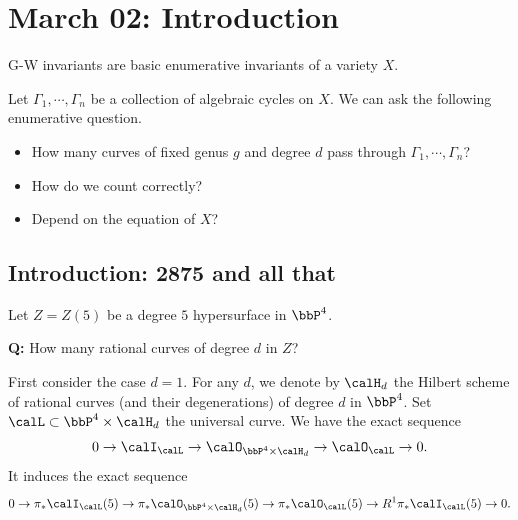 \section{March 02: Introduction}

G-W invariants are basic enumerative invariants of a variety \(X\).

Let \(\Gamma_1,\cdots,\Gamma_n\) be a collection of algebraic cycles on \(X\). 
We can ask the following enumerative question.
\begin{itemize}
    \item How many curves of fixed genus \(g\) and degree \(d\) pass through \(\Gamma_1,\cdots,\Gamma_n\)?
    \item How do we count correctly?
    \item Depend on the equation of \(X\)?
\end{itemize}

\subsection{Introduction: 2875 and all that}

    \begin{example}
        Let \(Z=Z(5)\) be a degree \(5\) hypersurface in \(\bbP^4\).
        
        \textbf{Q:} How many rational curves of degree \(d\) in \(Z\)?

        First consider the case \(d=1\).
        For any \(d\), we denote by \(\calH_d\) the Hilbert scheme of rational curves (and their degenerations) of degree \(d\) in \(\bbP^4\).
        Set \(\calL \subset \bbP^4 \times \calH_d\) the universal curve.
        We have the exact sequence
        \[ 0 \to \calI_{\calL} \to \calO_{\bbP^4 \times \calH_d} \to \calO_{\calL} \to 0. \]
        It induces the exact sequence
        \[ 0 \to \pi_*\calI_{\calL}(5) \to \pi_*\calO_{\bbP^4 \times \calH_d}(5) \to \pi_*\calO_{\calL}(5) \to R^1\pi_*\calI_{\calL}(5) \to 0. \]
    \end{example}